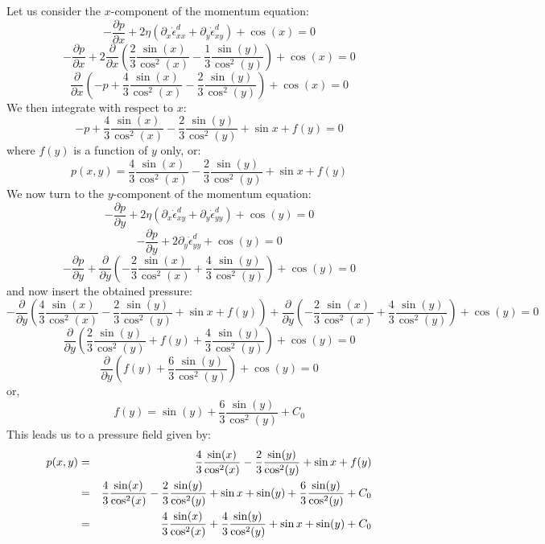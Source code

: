 Let us consider the $x$-component of the momentum equation:
\[
-\frac{\partial p}{\partial x} + 2 \eta \left( \partial_x \dot{\epsilon}_{xx}^d +
\partial_y \dot{\epsilon}_{xy}^d \right) + \cos(x) = 0
\]
\[
-\frac{\partial p}{\partial x} + 2 \frac{\partial}{\partial x} 
\left( \frac23 \frac{\sin(x)}{\cos^2(x)} -\frac13 \frac{\sin(y)}{\cos^2(y)} \right)
 + \cos(x) = 0
\]
\[
\frac{\partial}{\partial x} 
\left( -p +\frac43 \frac{\sin(x)}{\cos^2(x)} -\frac23 \frac{\sin(y)}{\cos^2(y)} \right)
 + \cos(x) = 0
\]
We then integrate with respect to $x$:
\[
-p +\frac43 \frac{\sin(x)}{\cos^2(x)} -\frac23 \frac{\sin(y)}{\cos^2(y)} 
+ \sin x + f(y) =0
\]
where $f(y)$ is a function of $y$ only, or:
\[
p(x,y) =
\frac43 \frac{\sin(x)}{\cos^2(x)} -\frac23 \frac{\sin(y)}{\cos^2(y)} 
+ \sin x + f(y) 
\]
We now turn to the $y$-component of the momentum equation:
\[
-\frac{\partial p}{\partial y} + 2 \eta \left( \partial_x \dot{\epsilon}_{xy}^d +
\partial_y \dot{\epsilon}_{yy}^d \right) + \cos(y) = 0
\]
\[
-\frac{\partial p}{\partial y} + 2\partial_y \dot{\epsilon}_{yy}^d + \cos(y) =0
\]
\[
-\frac{\partial p}{\partial y} +  \frac{\partial }{\partial y}
\left( -\frac23 \frac{\sin(x)}{\cos^2(x)}+  \frac43 \frac{\sin(y)}{\cos^2(y)} \right)
+ \cos(y) =0
\]
and now insert the obtained pressure:
\[
-\frac{\partial }{\partial y} 
\left( \frac43 \frac{\sin(x)}{\cos^2(x)} -\frac23 \frac{\sin(y)}{\cos^2(y)} + \sin x + f(y)   \right)
+ 
\frac{\partial }{\partial y}
 \left( -\frac23 \frac{\sin(x)}{\cos^2(x)}+  \frac43 \frac{\sin(y)}{\cos^2(y)} \right)
+ \cos(y) =0
\]
\[
\frac{\partial }{\partial y} 
\left( 
\frac23 \frac{\sin(y)}{\cos^2(y)} 
+ f(y) 
+ \frac43 \frac{\sin(y)}{\cos^2(y)} \right)
+ \cos(y) =0
\]
\[
\frac{\partial }{\partial y} \left(   f(y) + \frac63 \frac{\sin(y)}{\cos^2(y)}   \right) + \cos(y) = 0 
\]
or, 
\[
f(y)=\sin (y) + \frac63 \frac{\sin(y)}{\cos^2(y)}  +C_0
\]
This leads us to a pressure field given by: 
\begin{eqnarray}
p(x,y) 
&=&  \frac43 \frac{\sin(x)}{\cos^2(x)} -\frac23 \frac{\sin(y)}{\cos^2(y)} + \sin x + f(y) \nonumber\\
&=&  \frac43 \frac{\sin(x)}{\cos^2(x)} -\frac23 \frac{\sin(y)}{\cos^2(y)} + \sin x + 
\sin (y) + \frac63 \frac{\sin(y)}{\cos^2(y)}  +C_0 \nonumber\\
&=&  \frac43 \frac{\sin(x)}{\cos^2(x)} +\frac43 \frac{\sin(y)}{\cos^2(y)} + \sin x + \sin (y)   +C_0 \nonumber
\end{eqnarray}


